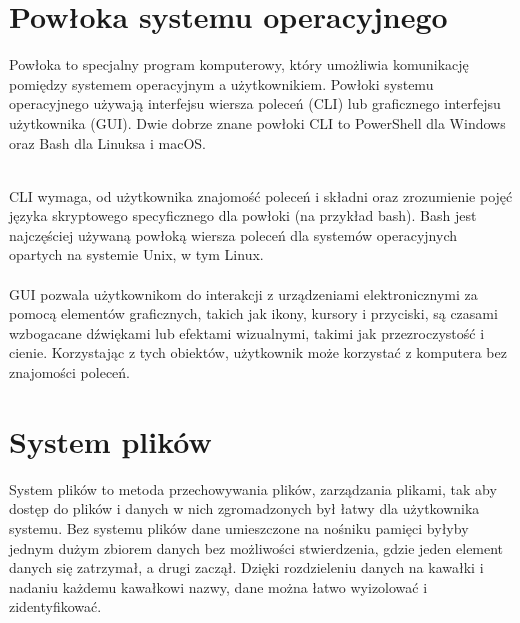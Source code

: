 \documentclass[10pt,a4paper]{report}
\begin{document}
\begin{adjustwidth}{2cm}{2cm}
\section{Powłoka systemu operacyjnego}
\begin{minipage}{1\linewidth}
Powłoka to specjalny program komputerowy, który umożliwia komunikację pomiędzy systemem operacyjnym a użytkownikiem. Powłoki systemu operacyjnego używają interfejsu wiersza poleceń (CLI) lub graficznego interfejsu użytkownika (GUI). Dwie dobrze znane powłoki CLI to PowerShell dla Windows oraz Bash dla Linuksa i macOS. \\ \\
\end{minipage}
\begin{minipage}{1\linewidth}
CLI wymaga, od użytkownika znajomość poleceń i składni oraz zrozumienie pojęć języka skryptowego specyficznego dla powłoki (na przykład bash). Bash jest najczęściej używaną powłoką wiersza poleceń dla systemów operacyjnych opartych na systemie Unix, w tym Linux. \\ \\
GUI pozwala użytkownikom do interakcji z urządzeniami elektronicznymi za pomocą elementów graficznych, takich jak ikony, kursory i przyciski, są czasami wzbogacane dźwiękami lub efektami wizualnymi, takimi jak przezroczystość i cienie. Korzystając z tych obiektów, użytkownik może korzystać z komputera bez znajomości poleceń.
\end{minipage}
\section{System plików}
\begin{minipage}{1\linewidth}
System plików to metoda przechowywania plików, zarządzania plikami, tak aby dostęp do plików i danych w nich zgromadzonych był łatwy dla użytkownika systemu. Bez systemu plików dane umieszczone na nośniku pamięci byłyby jednym dużym zbiorem danych bez możliwości stwierdzenia, gdzie jeden element danych się zatrzymał, a drugi zaczął. Dzięki rozdzieleniu danych na kawałki i nadaniu każdemu kawałkowi nazwy, dane można łatwo wyizolować i zidentyfikować. 
\end{minipage}

\end{adjustwidth}
\end{document}
